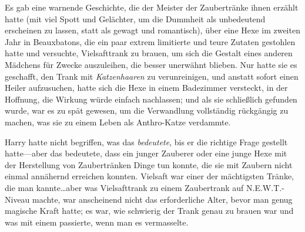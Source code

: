 Es gab eine warnende Geschichte, die der Meister der Zaubertränke ihnen erzählt hatte (mit viel Spott und Gelächter, um die Dummheit als unbedeutend erscheinen zu lassen, statt als gewagt und romantisch), über eine Hexe im zweiten Jahr in Beauxbatons, die ein paar extrem limitierte und teure Zutaten gestohlen hatte und versuchte, Vielsafttrank zu brauen, um sich die Gestalt eines anderen Mädchens für Zwecke auszuleihen, die besser unerwähnt blieben. Nur hatte sie es geschafft, den Trank mit \emph{Katzenhaaren} zu verunreinigen, und anstatt sofort einen Heiler aufzusuchen, hatte sich die Hexe in einem Badezimmer versteckt, in der Hoffnung, die Wirkung würde einfach nachlassen; und als sie schließlich gefunden wurde, war es zu spät gewesen, um die Verwandlung vollständig rückgängig zu machen, was sie zu einem Leben als Anthro-Katze verdammte.

Harry hatte nicht begriffen, was das \emph{bedeutete}, bis er die richtige Frage gestellt hatte—aber das bedeutete, dass ein junger Zauberer oder eine junge Hexe mit der Herstellung von Zaubertränken Dinge tun konnte, die sie mit Zaubern nicht einmal annähernd erreichen konnten. Vielsaft war einer der mächtigsten Tränke, die man kannte…aber was Vielsafttrank zu einem Zaubertrank auf N.E.W.T.-Niveau machte, war anscheinend nicht das erforderliche Alter, bevor man genug magische Kraft hatte; es war, wie schwierig der Trank genau zu brauen war und was mit einem passierte, wenn man es vermasselte.

